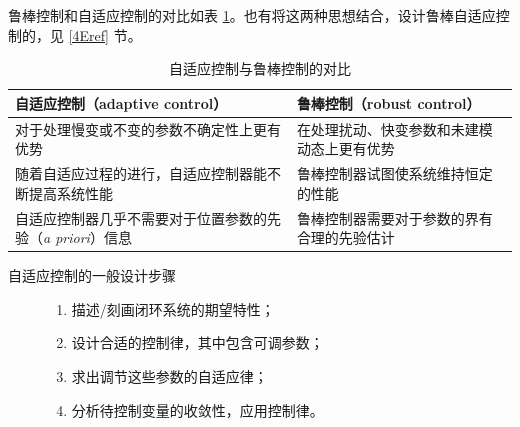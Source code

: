 鲁棒控制和自适应控制的对比如表 \ref{adaptive_robust_table}。也有将这两种思想结合，设计鲁棒自适应控制的，见 \ref{4Eref} 节。
\newpage
  \begin{table}[htbp]
    \vspace{5pt}
    \caption{自适应控制与鲁棒控制的对比}
    \label{adaptive_robust_table}
    \setcellgapes{4pt}
    \makegapedcells
    \small
    \centering
    \begin{tabular}{p{}|p{}}
      \hline
      {\bf 自适应控制（adaptive control）} & {\bf 鲁棒控制（robust control）} \\
      \hline
      对于处理慢变或不变的参数不确定性上更有优势 & 在处理扰动、快变参数和未建模动态上更有优势\\
      \hline
      随着自适应过程的进行，自适应控制器能不断提高系统性能 & 鲁棒控制器试图使系统维持恒定的性能 \\
      \hline
      自适应控制器几乎不需要对于位置参数的先验（{\it a priori}）信息 & 鲁棒控制器需要对于参数的界有合理的先验估计\\
      \hline
    \end{tabular}
  \end{table}

\begin{description}
  \item[自适应控制的一般设计步骤] 
  \begin{enumerate}
    \item 描述/刻画闭环系统的期望特性；
    \item 设计合适的控制律，其中包含可调参数；
    \item 求出调节这些参数的自适应律；
    \item 分析待控制变量的收敛性，应用控制律。
  \end{enumerate}
\end{description}
